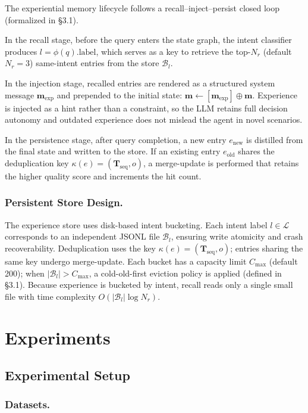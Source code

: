 \documentclass[runningheads]{llncs}
\begin{document}
The experiential memory lifecycle follows a recall--inject--persist closed loop (formalized in \S3.1).

In the recall stage, before the query enters the state graph, the intent classifier produces $l = \phi(q).\text{label}$, which serves as a key to retrieve the top-$N_r$ (default $N_r = 3$) same-intent entries from the store $\mathcal{B}_l$.

In the injection stage, recalled entries are rendered as a structured system message $\mathbf{m}_{\text{exp}}$ and prepended to the initial state: $\mathbf{m} \leftarrow [\mathbf{m}_{\text{exp}}] \oplus \mathbf{m}$. Experience is injected as a hint rather than a constraint, so the LLM retains full decision autonomy and outdated experience does not mislead the agent in novel scenarios.

In the persistence stage, after query completion, a new entry $e_{\text{new}}$ is distilled from the final state and written to the store. If an existing entry $e_{\text{old}}$ shares the deduplication key $\kappa(e) = (\mathbf{T}_{\text{seq}}, o)$, a merge-update is performed that retains the higher quality score and increments the hit count.

\subsubsection{Persistent Store Design.}

The experience store uses disk-based intent bucketing. Each intent label $l \in \mathcal{L}$ corresponds to an independent JSONL file $\mathcal{B}_l$, ensuring write atomicity and crash recoverability. Deduplication uses the key $\kappa(e) = (\mathbf{T}_{\text{seq}}, o)$; entries sharing the same key undergo merge-update. Each bucket has a capacity limit $C_{\max}$ (default 200); when $|\mathcal{B}_l| > C_{\max}$, a cold-old-first eviction policy is applied (defined in \S3.1). Because experience is bucketed by intent, recall reads only a single small file with time complexity $O(|\mathcal{B}_l| \log N_r)$.

\section{Experiments}

\subsection{Experimental Setup}

\subsubsection{Datasets.}
\end{document}
